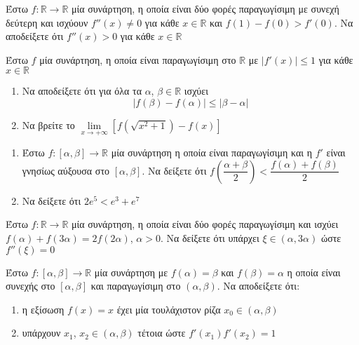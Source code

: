 \documentclass{presentation}
\begin{document}
\begin{askisi}
  Έστω $f:\mathbb{R}\to\mathbb{R}$ μία συνάρτηση, η οποία είναι δύο φορές παραγωγίσιμη με συνεχή δεύτερη και ισχύουν $f''(x)\ne 0$ για κάθε $x\in\mathbb{R}$ και $f(1)-f(0)>f'(0)$. Να αποδείξετε ότι $f''(x)>0$ για κάθε $x\in\mathbb{R}$

\end{askisi}

\begin{askisi}
  Έστω $f$ μία συνάρτηση, η οποία είναι παραγωγίσιμη στο $\mathbb{R}$ με $|f'(x)|\le 1$ για κάθε $x\in\mathbb{R}$
  \begin{enumerate}
    \item<1-> Να αποδείξετε ότι για όλα τα $α$, $β\in\mathbb{R}$ ισχύει
          $$|f(β)-f(α)|\le |β-α|$$
    \item<2-> Να βρείτε το $\lim\limits_{x \to +\infty}{ \left[  f\left( \sqrt{x^2+1} \right)-f(x)  \right]}$
  \end{enumerate}
\end{askisi}

\begin{askisi}
  \begin{enumerate}
    \item<1-> Έστω $f:[α,β]\to\mathbb{R}$ μία συνάρτηση η οποία είναι παραγωγίσιμη και η $f'$ είναι γνησίως αύξουσα στο $[α,β]$. Να δείξετε ότι $f\left( \dfrac{α+β}{2} \right)<\dfrac{f(α)+f(β)}{2} $
    \item<2-> Να δείξετε ότι $2e^5<e^3+e^7$
  \end{enumerate}

\end{askisi}

\begin{askisi}
  Έστω $f:\mathbb{R}\to\mathbb{R}$ μία συνάρτηση, η οποία είναι δύο φορές παραγωγίσιμη και ισχύει $f(α)+f(3α)=2f(2α)$, $α>0$. Να δείξετε ότι υπάρχει $ξ\in (α,3α)$ ώστε $f''(ξ)=0$

\end{askisi}

\begin{askisi}
  Έστω $f:[α,β]\to\mathbb{R}$ μία συνάρτηση με $f(α)=β$ και $f(β)=α$ η οποία είναι συνεχής στο $[α,β]$ και παραγωγίσιμη στο $(α,β)$. Να αποδείξετε ότι:
  \begin{enumerate}
    \item<1-> η εξίσωση $f(x)=x$ έχει μία τουλάχιστον ρίζα $x_0\in (α,β)$
    \item<2-> υπάρχουν $x_1$, $x_2\in (α,β)$ τέτοια ώστε $f'(x_1)f'(x_2)=1$
  \end{enumerate}

\end{askisi}
\end{document}
